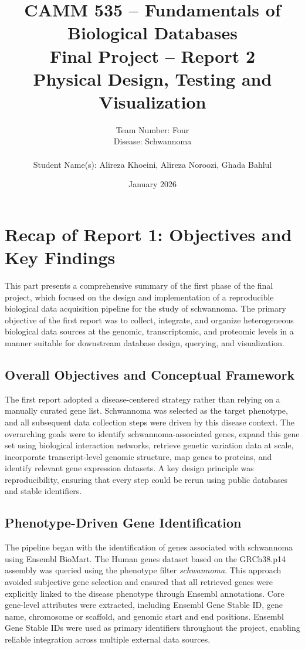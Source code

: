 \documentclass[12pt]{article}
\title{
	\textbf{CAMM 535 – Fundamentals of Biological Databases} \\
	\vspace{0.5em}
	\textbf{Final Project – Report 2} \\
	\vspace{0.5em}
	Physical Design, Testing and Visualization
}
\author{
	Team Number: Four \\
	Disease: Schwannoma \\
	\vspace{0.5em} \\
	Student Name(s): Alireza Khoeini, Alireza Noroozi, Ghada Bahlul
}
\date{
	January 2026
}
\begin{document}
	
	\maketitle
	\newpage
	
	
	
	\section*{Recap of Report 1: Objectives and Key Findings}
	
	
	This part presents a comprehensive summary of the first phase of the final project, which focused on the design and implementation of a reproducible biological data acquisition pipeline for the study of schwannoma. The primary objective of the first report was to collect, integrate, and organize heterogeneous biological data sources at the genomic, transcriptomic, and proteomic levels in a manner suitable for downstream database design, querying, and visualization.
	
	\subsection*{Overall Objectives and Conceptual Framework}
	
	The first report adopted a disease-centered strategy rather than relying on a manually curated gene list. Schwannoma was selected as the target phenotype, and all subsequent data collection steps were driven by this disease context. The overarching goals were to identify schwannoma-associated genes, expand this gene set using biological interaction networks, retrieve genetic variation data at scale, incorporate transcript-level genomic structure, map genes to proteins, and identify relevant gene expression datasets. A key design principle was reproducibility, ensuring that every step could be rerun using public databases and stable identifiers.
	
	\subsection*{Phenotype-Driven Gene Identification}
	
	The pipeline began with the identification of genes associated with schwannoma using Ensembl BioMart. The Human genes dataset based on the GRCh38.p14 assembly was queried using the phenotype filter \textit{schwannoma}. This approach avoided subjective gene selection and ensured that all retrieved genes were explicitly linked to the disease phenotype through Ensembl annotations. Core gene-level attributes were extracted, including Ensembl Gene Stable ID, gene name, chromosome or scaffold, and genomic start and end positions. Ensembl Gene Stable IDs were used as primary identifiers throughout the project, enabling reliable integration across multiple external data sources.
	
\end{document}
